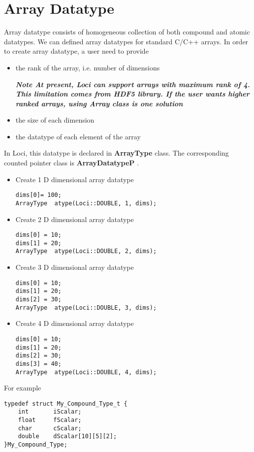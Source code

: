 \section{Array Datatype}
Array datatype consists of homogeneous collection of both compound and 
atomic datatypes. We can defined array datatypes for standard C/C++
arrays. In order to create array datatype, a user need to provide
\begin{itemize}
\item the rank of the array, i.e. number of dimensions 
\par {\em \bf Note At present, Loci can support arrays with maximum rank of
4. This limitation comes from HDF5 library. If the user wants higher ranked
arrays, using {\bf Array class} is one solution}
\item the size of each dimension
\item the datatype of each element of the array
\end{itemize}
\par In Loci, this datatype is declared in {\bf ArrayType} class. The 
corresponding counted pointer class is {
\bf ArrayDatatypeP
}.
%
\begin{itemize}
\item Create 1 D dimensional array datatype
\begin{verbatim}
dims[0]= 100;
ArrayType  atype(Loci::DOUBLE, 1, dims);
\end{verbatim}
%
\item Create 2 D dimensional array datatype
\begin{verbatim}
dims[0] = 10;
dims[1] = 20;
ArrayType  atype(Loci::DOUBLE, 2, dims);
\end{verbatim}
%
\item Create 3 D dimensional array datatype
\begin{verbatim}
dims[0] = 10;
dims[1] = 20;
dims[2] = 30;
ArrayType  atype(Loci::DOUBLE, 3, dims);
\end{verbatim}
%
\item Create 4 D dimensional array datatype
\begin{verbatim}
dims[0] = 10;
dims[1] = 20;
dims[2] = 30;
dims[3] = 40;
ArrayType  atype(Loci::DOUBLE, 4, dims);
\end{verbatim}
\end{itemize}
%
%
\par For example
\begin{verbatim}
typedef struct My_Compound_Type_t {
    int       iScalar;
    float     fScalar;
    char      cScalar;
    double    dScalar[10][5][2];
}My_Compound_Type;
\end{verbatim}
